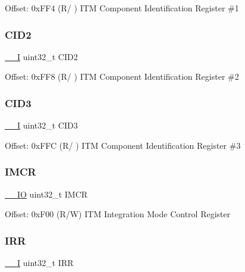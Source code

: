 Offset\+: 0x\+F\+F4 (R/ ) I\+TM Component Identification Register \#1 \mbox{\label{struct_i_t_m___type_ab36bf4236041f727b3e5cf2cfaa2aa04}} 
\subsubsection{\texorpdfstring{C\+I\+D2}{CID2}}
{\footnotesize\ttfamily \mbox{\hyperlink{core__cm3_8h_af63697ed9952cc71e1225efe205f6cd3}{\+\_\+\+\_\+I}} uint32\+\_\+t C\+I\+D2}

Offset\+: 0x\+F\+F8 (R/ ) I\+TM Component Identification Register \#2 \mbox{\label{struct_i_t_m___type_acb2fedfd1da6ff2a57d25fec513ffe25}} 
\subsubsection{\texorpdfstring{C\+I\+D3}{CID3}}
{\footnotesize\ttfamily \mbox{\hyperlink{core__cm3_8h_af63697ed9952cc71e1225efe205f6cd3}{\+\_\+\+\_\+I}} uint32\+\_\+t C\+I\+D3}

Offset\+: 0x\+F\+FC (R/ ) I\+TM Component Identification Register \#3 \mbox{\label{struct_i_t_m___type_aa75460116777434aebcd8698b46514cd}} 
\subsubsection{\texorpdfstring{I\+M\+CR}{IMCR}}
{\footnotesize\ttfamily \mbox{\hyperlink{core__cm3_8h_aec43007d9998a0a0e01faede4133d6be}{\+\_\+\+\_\+\+IO}} uint32\+\_\+t I\+M\+CR}

Offset\+: 0x\+F00 (R/W) I\+TM Integration Mode Control Register \mbox{\label{struct_i_t_m___type_a5f1859b657556cbeeb743b0da2e71654}} 
\subsubsection{\texorpdfstring{I\+RR}{IRR}}
{\footnotesize\ttfamily \mbox{\hyperlink{core__cm3_8h_af63697ed9952cc71e1225efe205f6cd3}{\+\_\+\+\_\+I}} uint32\+\_\+t I\+RR}

